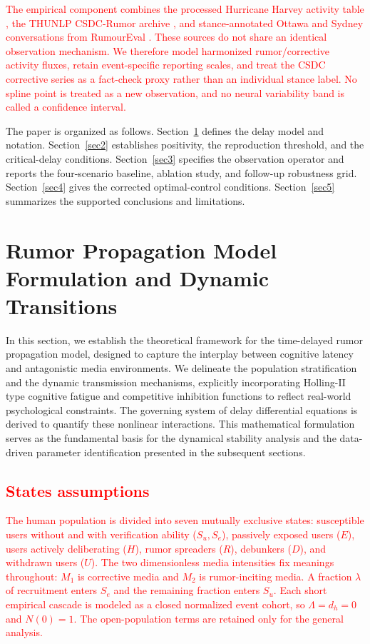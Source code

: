 \documentclass[letterpaper,journal]{IEEEtran}
\begin{document}
	\textcolor{red}{
	The empirical component combines the processed Hurricane Harvey activity table \cite{jiang2021reciprocal}, the THUNLP CSDC-Rumor archive \cite{csdc2021rumor}, and stance-annotated Ottawa and Sydney conversations from RumourEval \cite{zubiaga2016threads,gorrell2019rumoureval,rumoureval2019data}. These sources do not share an identical observation mechanism. We therefore model harmonized rumor/corrective activity fluxes, retain event-specific reporting scales, and treat the CSDC corrective series as a fact-check proxy rather than an individual stance label. No spline point is treated as a new observation, and no neural variability band is called a confidence interval.
	}

	The paper is organized as follows. Section~\ref{sec1} defines the delay model and notation. Section~\ref{sec2} establishes positivity, the reproduction threshold, and the critical-delay conditions. Section~\ref{sec3} specifies the observation operator and reports the four-scenario baseline, ablation study, and follow-up robustness grid. Section~\ref{sec4} gives the corrected optimal-control conditions. Section~\ref{sec5} summarizes the supported conclusions and limitations.
	
	\section{Rumor Propagation Model Formulation and Dynamic Transitions}
	\label{sec1}
	
	In this section, we establish the theoretical framework for the time-delayed rumor propagation model, designed to capture the interplay between cognitive latency and antagonistic media environments. We delineate the population stratification and the dynamic transmission mechanisms, explicitly incorporating Holling-II type cognitive fatigue and competitive inhibition functions to reflect real-world psychological constraints. The governing system of delay differential equations is derived to quantify these nonlinear interactions. This mathematical formulation serves as the fundamental basis for the dynamical stability analysis and the data-driven parameter identification presented in the subsequent sections.
	
	\subsection{\textcolor{red}{States assumptions}}
	\textcolor{red}{
	The human population is divided into seven mutually exclusive states: susceptible users without and with verification ability ($S_u,S_e$), passively exposed users ($E$), users actively deliberating ($H$), rumor spreaders ($R$), debunkers ($D$), and withdrawn users ($U$). The two dimensionless media intensities fix meanings throughout: $M_1$ is corrective media and $M_2$ is rumor-inciting media. A fraction $\lambda$ of recruitment enters $S_e$ and the remaining fraction enters $S_u$. Each short empirical cascade is modeled as a closed normalized event cohort, so $\Lambda=d_h=0$ and $N(0)=1$. The open-population terms are retained only for the general analysis.
	}
\end{document}
